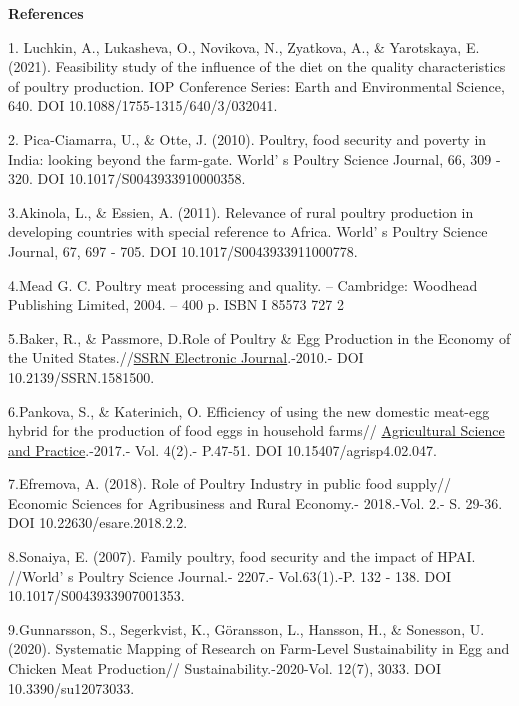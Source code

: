 \begin{center}
{\bfseries References}
\end{center}
\begin{references}

1. Luchkin, A., Lukasheva, O., Novikova, N., Zyatkova, A., \& Yarotskaya,
  E. (2021). Feasibility study of the influence of the diet on the
  quality characteristics of poultry production. IOP Conference Series:
  Earth and Environmental Science, 640. DOI
  10.1088/1755-1315/640/3/032041.

 2. Pica-Ciamarra, U., \& Otte, J. (2010). Poultry, food security and
  poverty in India: looking beyond the farm-gate.
  World' s Poultry Science Journal, 66, 309 - 320. DOI
  10.1017/S0043933910000358.


3.Akinola, L., \& Essien, A. (2011). Relevance of rural poultry
production in developing countries with special reference to Africa.
World' s Poultry Science Journal, 67, 697 - 705. \linebreak DOI 10.1017/S0043933911000778.

4.Mead G. C. Poultry meat processing and quality. -- Cambridge: Woodhead
Publishing Limited, 2004. -- 400 p. ISBN I 85573 727 2

5.Baker, R., \& Passmore, D.Role of Poultry \& Egg Production in the
Economy of the United
States.//\href{https://www.researchgate.net/journal/SSRN-Electronic-Journal-1556-5068?_tp=eyJjb250ZXh0Ijp7ImZpcnN0UGFnZSI6InB1YmxpY2F0aW9uIiwicGFnZSI6InB1YmxpY2F0aW9uIn19}{SSRN
Electronic Journal}.-2010.- DOI 10.2139/SSRN.1581500.

6.Pankova, S., \& Katerinich, O. Efficiency of using the new domestic
meat-egg hybrid for the production of food eggs in household farms//
\href{https://agrisp.com/index.php/agrisp/issue/view/11}{Agricultural
Science and Practice}.-2017.- Vol. 4(2).- P.47-51. DOI
10.15407/agrisp4.02.047.

7.Efremova, A. (2018). Role of Poultry Industry in public food supply//
Economic Sciences for Agribusiness and Rural Economy.- 2018.-Vol. 2.- S.
29-36. DOI 10.22630/esare.2018.2.2.

8.Sonaiya, E. (2007). Family poultry, food security and the impact of
HPAI. //World' s Poultry Science Journal.- 2207.-
Vol.63(1).-P. 132 - 138. DOI 10.1017/S0043933907001353.

9.Gunnarsson, S., Segerkvist, K., Göransson, L., Hansson, H., \&
Sonesson, U. (2020). Systematic Mapping of Research on Farm-Level
Sustainability in Egg and Chicken Meat Production//
Sustainability.-2020-Vol. 12(7), 3033. DOI 10.3390/su12073033.


\end{references}
